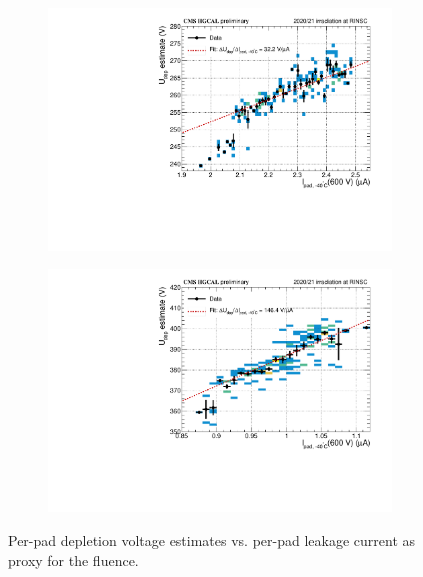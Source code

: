 \begin{figure}
	\captionsetup[subfigure]{aboveskip=-1pt,belowskip=-1pt}
	\centering
	\begin{subfigure}[b]{0.49\textwidth}
		\centering
		\includegraphics[width=0.999\textwidth]{plots/Vdep_vs_fluence/Vdep_vs_current_5414.pdf}
		\subcaption{
			}
			\label{plot:Vdep_vs_current_5414}
	\end{subfigure}
	\hfill
	\begin{subfigure}[b]{0.49\textwidth}
		\centering
		\includegraphics[width=0.999\textwidth]{plots/Vdep_vs_fluence/Vdep_vs_current_1002.pdf}
		\subcaption{
		}
		\label{plot:Vdep_vs_current_1002}
	\end{subfigure}	
	\caption{
		Per-pad depletion voltage estimates vs. per-pad leakage current as proxy for the fluence.
	}
\end{figure}

\label{subsec:irradiation_Vdep}
